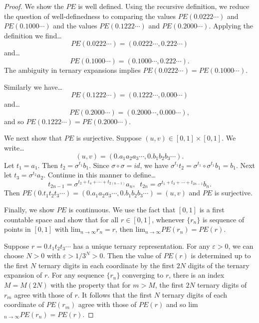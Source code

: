 \begin{proof}
We show the $PE$ is well defined. Using the recursive definition, we reduce the question of well-definedness to comparing the values $PE(0.0222\cdots)$ and $PE(0.1000\cdots)$ and
the values $PE(0.1222\cdots)$ and $PE(0.2000\cdots)$. Applying the definition we find\dots
$$PE(0.0222\cdots) = (0.0222\cdots, 0.222\cdots)$$
and\dots
$$PE(0.1000\cdots) = (0.1000\cdots, 0.222\cdots).$$
The ambiguity in ternary expansions implies $PE(0.0222\cdots) = PE(0.1000\cdots).$

Similarly we have\dots
$$PE(0.1222\cdots) = (0.1222\cdots, 0.000\cdots)$$
and\dots
$$PE(0.2000\cdots) = (0.2000\cdots, 0.000\cdots),$$
and so $PE(0.1222\cdots) = PE(0.2000\cdots).$

We next show that $PE$ is surjective. Suppose $(u,v) \in [0,1] \times [0,1].$ We write\dots
$$(u,v) = (0.a_1a_2a_3\cdots, 0.b_1b_2b_3\cdots).$$
Let $t_1 = a_1$. Then $t_2 = \sigma^{t_1}b_1$. Since $\sigma \circ \sigma = id$, we have $\sigma^{t_1}t_2 = \sigma^{t_1}\circ \sigma^{t_1}b_1 = b_1$. Next let $t_3 = \sigma^{t_2}a_2$. Continue
in this manner to define\dots
$$t_{2n-1} = \sigma^{t_2 + t_4 + \cdots + t_{2(n-1)}}a_n, \; \; t_{2n} = \sigma^{t_1 + t_3 + \cdots + t_{2n-1}}b_n.$$
Then $PE(0.t_1t_2t_3\cdots) = (0.a_1a_2a_3\cdots, 0.b_1b_2b_3\cdots) = (u,v)$ and $PE$ is surjective.

Finally, we show $PE$ is continuous. We use the fact that $[0,1]$ is a first countable space and show that for all $r \in [0,1]$,
whenever $\{ r_n \}$ is sequence of points in $[0,1]$ with lim$_{n \rightarrow \infty}r_n = r$, then lim$_{n \rightarrow \infty}PE(r_n) = PE(r).$

Suppose $r = 0.t_1t_2t_3\cdots$ has a unique ternary representation. For any $\varepsilon > 0$, we can choose $N > 0$ with $\varepsilon > 1/3^N > 0.$ Then the value of $PE(r)$ is determined up to
the first $N$ ternary digits in each coordinate by the first $2N$ digits of the ternary expansion of $r$. For any sequence $\{ r_n \}$ converging to $r$, there is an index $M = M(2N)$ with the property
that for $m > M$, the first $2N$ ternary digits of $r_m$ agree with those of $r$. It follows that the first $N$ ternary digits of each coordinate of $PE(r_m)$ agree with those of $PE(r)$ and so
lim$_{n \rightarrow \infty}PE(r_n) = PE(r).$


\end{proof}
